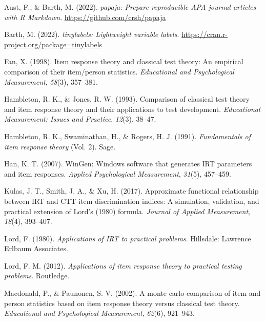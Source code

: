 \documentclass[
  man]{apa6}
\newlength{\cslhangindent}
\newlength{\cslentryspacingunit} %
\newenvironment{CSLReferences}[2] %
 {%
  \setlength{\parindent}{0pt}
  \ifodd #1
  \let\oldpar\par
  \def\par{\hangindent=\cslhangindent\oldpar}
  \fi
  \setlength{\parskip}{#2\cslentryspacingunit}
 }%
 {}
\begin{document}
\hypertarget{refs}{}
\begin{CSLReferences}{1}{0}
\leavevmode{}%
Aust, F., \& Barth, M. (2022). \emph{{papaja}: {Prepare} reproducible {APA} journal articles with {R Markdown}}. \url{https://github.com/crsh/papaja}

\leavevmode{}%
Barth, M. (2022). \emph{{tinylabels}: Lightweight variable labels}. \url{https://cran.r-project.org/package=tinylabels}

\leavevmode{}%
Fan, X. (1998). Item response theory and classical test theory: An empirical comparison of their item/person statistics. \emph{Educational and Psychological Measurement}, \emph{58}(3), 357--381.

\leavevmode{}%
Hambleton, R. K., \& Jones, R. W. (1993). Comparison of classical test theory and item response theory and their applications to test development. \emph{Educational Measurement: Issues and Practice}, \emph{12}(3), 38--47.

\leavevmode{}%
Hambleton, R. K., Swaminathan, H., \& Rogers, H. J. (1991). \emph{Fundamentals of item response theory} (Vol. 2). Sage.

\leavevmode{}%
Han, K. T. (2007). WinGen: Windows software that generates IRT parameters and item responses. \emph{Applied Psychological Measurement}, \emph{31}(5), 457--459.

\leavevmode{}%
Kulas, J. T., Smith, J. A., \& Xu, H. (2017). Approximate functional relationship between IRT and CTT item discrimination indices: A simulation, validation, and practical extension of {Lord's} (1980) formula. \emph{Journal of Applied Measurement}, \emph{18}(4), 393--407.

\leavevmode{}%
Lord, F. (1980). \emph{Applications of IRT to practical problems}. Hillsdale: Lawrence Erlbaum Associates.

\leavevmode{}%
Lord, F. M. (2012). \emph{Applications of item response theory to practical testing problems}. Routledge.

\leavevmode{}%
Macdonald, P., \& Paunonen, S. V. (2002). A monte carlo comparison of item and person statistics based on item response theory versus classical test theory. \emph{Educational and Psychological Measurement}, \emph{62}(6), 921--943.


\end{CSLReferences}
\end{document}
